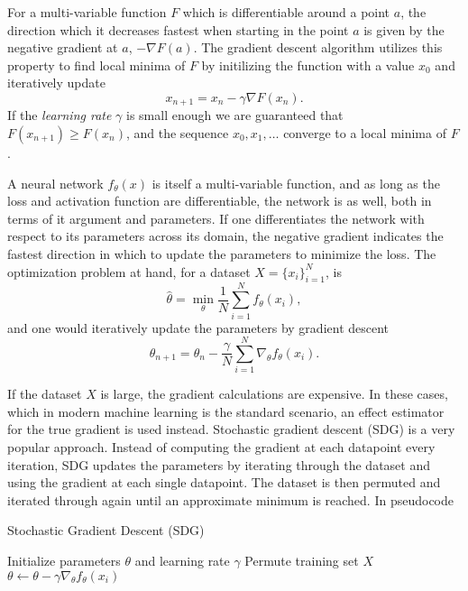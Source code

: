 \documentclass[../../thesis.tex]{subfiles}
\begin{document}
For a multi-variable function $F$ which is differentiable around a point $a$, the direction which it decreases fastest when starting in the point $a$ is given by the negative gradient at $a$, $-\nabla F(a)$. The gradient descent algorithm utilizes this property to find local minima of $F$ by initilizing the function with a value $x_0$ and iteratively update 
\[
    x_{n+1} = x_{n} -\gamma \nabla F(x_{n}).
\] 
If the \textit{learning rate} $\gamma$ is small enough we are guaranteed that $F(x_{n+1})\geq F(x_{n})$, and the sequence $x_0,x_1,\dots$ converge to a local minima of $F$.\newline

A neural network $f_\theta(x)$ is itself a multi-variable function, and as long as the loss and activation function are differentiable, the network is as well, both in terms of it argument and parameters. If one differentiates the network with respect to its parameters across its domain, the negative gradient indicates the fastest direction in which to update the parameters to minimize the loss. The optimization problem at hand, for a dataset $X = \{x_i\}_{i=1}^N$, is
\[
   \widehat{\theta} = \min_{\theta} \frac{1}{N}\sum_{i=1}^N f_\theta(x_i),
\]
and one would iteratively update the parameters by gradient descent 
\[
    \theta_{n+1} = \theta_{n} - \frac{\gamma}{N}\sum_{i=1}^N\nabla_\theta f_\theta(x_i).
\]

If the dataset $X$ is large, the gradient calculations are expensive. In these cases, which in modern machine learning is the standard scenario, an effect estimator for the true gradient is used instead. Stochastic gradient descent (SDG) is a very popular approach. Instead of computing the gradient at each datapoint every iteration, SDG updates the parameters by iterating through the dataset and using the gradient at each single datapoint. The dataset is then permuted and iterated through again until an approximate minimum is reached. In pseudocode 

\begin{algorithm}
\caption{Stochastic Gradient Descent (SDG)}
\begin{algorithmic}
    \State Initialize parameters $\theta$ and learning rate $\gamma$
        \State Permute training set $X$
        \State $\theta \gets \theta - \gamma\nabla_\theta f_\theta(x_i)$
    \EndFor
    \EndWhile
\end{algorithmic}
\end{algorithm}
\end{document}
